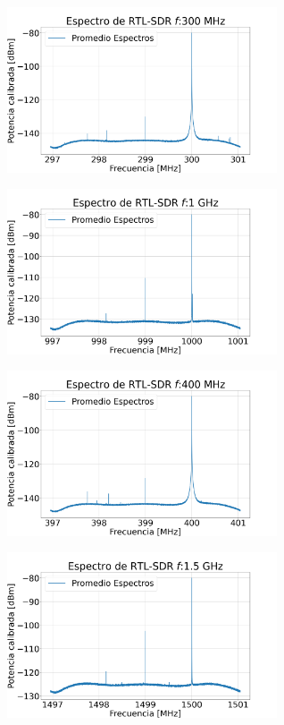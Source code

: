 \begin{figure}
    \centering
    \begin{subfigure}[b]{8cm}
        \centering
        \includegraphics[width=8cm]{img/rtl300}
    \end{subfigure}
    \hfill
    \begin{subfigure}[b]{8cm}
        \centering
        \includegraphics[width=8cm]{img/rtl1000}
    \end{subfigure}
    \hfill
    \begin{subfigure}[b]{8cm}
        \centering
        \includegraphics[width=8cm]{img/rtl400}
    \end{subfigure}
    \hfill
    \begin{subfigure}[b]{8cm}
        \centering
        \includegraphics[width=8cm]{img/rtl1500}

\end{subfigure}
\end{figure}
